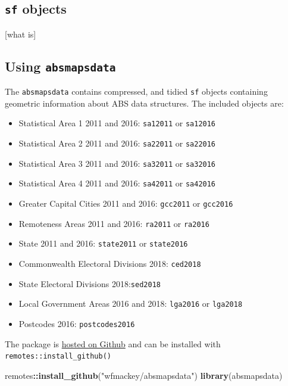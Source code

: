\documentclass[
]{book}
\newenvironment{Shaded}{\begin{snugshade}}{\end{snugshade}}
\newcommand{\KeywordTok}[1]{\textcolor[rgb]{0.13,0.29,0.53}{\textbf{#1}}}
\newcommand{\NormalTok}[1]{#1}
\newcommand{\OperatorTok}[1]{\textcolor[rgb]{0.81,0.36,0.00}{\textbf{#1}}}
\newcommand{\StringTok}[1]{\textcolor[rgb]{0.31,0.60,0.02}{#1}}
\providecommand{\tightlist}{%
  \setlength{\itemsep}{0pt}\setlength{\parskip}{0pt}}
\begin{document}
\hypertarget{sf-objects}{%
\subsection{\texorpdfstring{\texttt{sf} objects}{sf objects}}\label{sf-objects}}

{[}what is{]}

\hypertarget{using-absmapsdata}{%
\subsection{\texorpdfstring{Using \texttt{absmapsdata}}{Using absmapsdata}}\label{using-absmapsdata}}

The \texttt{absmapsdata} contains compressed, and tidied \texttt{sf} objects containing geometric information about ABS data structures. The included objects are:

\begin{itemize}
\tightlist
\item
  Statistical Area 1 2011 and 2016: \texttt{sa12011} or \texttt{sa12016}
\item
  Statistical Area 2 2011 and 2016: \texttt{sa22011} or \texttt{sa22016}
\item
  Statistical Area 3 2011 and 2016: \texttt{sa32011} or \texttt{sa32016}
\item
  Statistical Area 4 2011 and 2016: \texttt{sa42011} or \texttt{sa42016}
\item
  Greater Capital Cities 2011 and 2016: \texttt{gcc2011} or \texttt{gcc2016}
\item
  Remoteness Areas 2011 and 2016: \texttt{ra2011} or \texttt{ra2016}
\item
  State 2011 and 2016: \texttt{state2011} or \texttt{state2016}
\item
  Commonwealth Electoral Divisions 2018: \texttt{ced2018}
\item
  State Electoral Divisions 2018:\texttt{sed2018}
\item
  Local Government Areas 2016 and 2018: \texttt{lga2016} or \texttt{lga2018}
\item
  Postcodes 2016: \texttt{postcodes2016}
\end{itemize}

The package is \href{https://github.com/wfmackey/absmapsdata}{hosted on Github} and can be installed with \texttt{remotes::install\_github()}

\begin{Shaded}
\begin{Highlighting}[]
\NormalTok{remotes}\OperatorTok{::}\KeywordTok{install\_github}\NormalTok{(}\StringTok{"wfmackey/absmapsdata"}\NormalTok{)}
\KeywordTok{library}\NormalTok{(absmapsdata)}
\end{Highlighting}
\end{Shaded}
\end{document}
